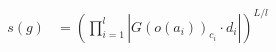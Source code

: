 \documentclass[preview]{standalone}
\begin{document}
\begin{align*}
s(g) &= \left(\prod_{i=1}^{l}\left|G(o(a_i))_{c_i}\cdot d_i\right|\right)^{L/l}
\end{align*}
\end{document}
